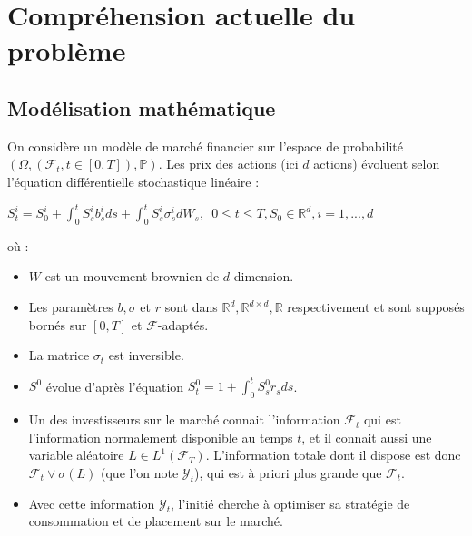 \documentclass[french]{beamer}
\begin{document}
\section{Compréhension actuelle du problème}
\subsection{Modélisation mathématique}
\begin{frame}
On considère un modèle de marché financier sur l'espace de probabilité $(\Omega, (\mathcal{F}_t, t \in [0,T]), \mathbb{P})$. Les prix des actions (ici $d$ actions) évoluent selon l'équation différentielle stochastique linéaire : 
\begin{center}
$\displaystyle S^i_t = S^i_0 + \int_{0}^{t} S^i_s b^i_s ds +  \int_{0}^{t} S^i_s \sigma^i_s dW_s,$\
$0 \leq t \leq T, S_0 \in \mathbb{R}^d, i = 1, ... , d$
\end{center}
\end{frame}
\newpage

\begin{frame}
où : 
\begin{itemize}
\item $W$ est un mouvement brownien de $d$-dimension.
\item Les paramètres $b, \sigma$ et $r$ sont dans $\mathbb{R}^d, \mathbb{R}^{d\times d}, \mathbb{R}$ respectivement et sont supposés bornés sur $[0,T]$ et $\mathcal{F}$-adaptés.
\item La matrice $\sigma_t$ est inversible.
\item $S^0$ évolue d'après l'équation $S^0_t = 1 +\int_{0}^{t}S^0_s r_s ds$.
\end{itemize}
\end{frame}
\newpage

\begin{frame}
\begin{itemize}
\item Un des investisseurs sur le marché connait l'information $\mathcal{F}_t$ qui est l'information normalement disponible au temps $t$, et il connait aussi une variable aléatoire $L \in L^1(\mathcal{F}_T)$. L'information totale dont il dispose est donc $\mathcal{F}_t \vee \sigma(L)$ (que l'on note $\mathcal{Y}_t$), qui est à priori plus grande que $\mathcal{F}_t$.
\item Avec cette information $\mathcal{Y}_t$, l'initié cherche à optimiser sa stratégie de consommation et de placement sur le marché.
\end{itemize}
\end{frame}
\newpage
\end{document}
